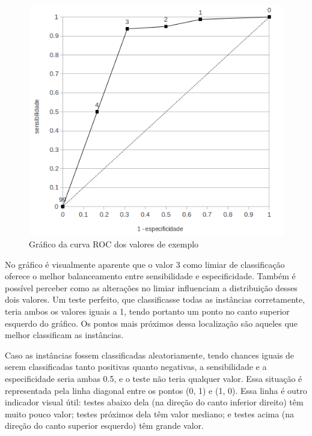 \begin{figure}[h!]
    \vspace{1cm}
    \centering
    \includegraphics[scale=0.5]{img/roc.png}
    \caption{Gráfico da curva ROC dos valores de exemplo}
    \label{fraud:roc}
    \vspace{1cm}
\end{figure}

No gráfico é visualmente aparente que o valor 3 como limiar de classificação oferece o melhor balanceamento entre sensibilidade e especificidade. Também é possível perceber como as alterações no limiar influenciam a distribuição desses dois valores. Um teste perfeito, que classificasse todas as instâncias corretamente, teria ambos os valores iguais a 1, tendo portanto um ponto no canto superior esquerdo do gráfico. Os pontos mais próximos dessa localização são aqueles que melhor classificam as instâncias.

Caso as instâncias fossem classificadas aleatoriamente, tendo chances iguais de serem classificadas tanto positivas quanto negativas, a sensibilidade e a especificidade seria ambas 0.5, e o teste não teria qualquer valor. Essa situação é representada pela linha diagonal entre os pontos (0, 1) e (1, 0). Essa linha é outro indicador visual útil: testes abaixo dela (na direção do canto inferior direito) têm muito pouco valor; testes próximos dela têm valor mediano; e testes acima (na direção do canto superior esquerdo) têm grande valor.

